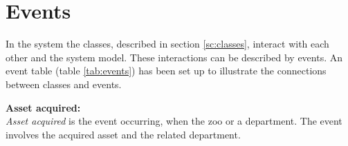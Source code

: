 \section{Events}\label{sc:events}

In the system the classes, described in section \ref{sc:classes}, interact with each other and the system model. These interactions can be described by events. An event table (table \ref{tab:events}) has been set up to illustrate the connections between classes and events. 

\begin{table}[H]
\centering
{}
\caption{Event table showing which classes are involved with the different events. An event can happen once (+) or several (*) times for each class.}\label{tab:events}
\end{table}

\textbf{Asset acquired:}\\
\textit{Asset acquired} is the event occurring, when the zoo or a department. The event involves the acquired asset and the related department.\\

